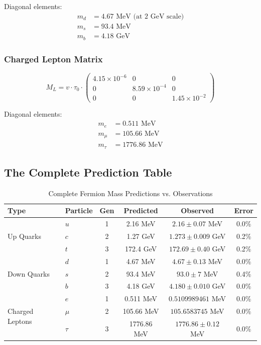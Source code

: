 Diagonal elements:
\begin{align}
    m_d &= 4.67 \text{ MeV (at 2 GeV scale)} \\
    m_s &= 93.4 \text{ MeV} \\
    m_b &= 4.18 \text{ GeV}
\end{align}

\subsubsection{Charged Lepton Matrix}

\begin{equation}
    M_L = v \cdot \tau_0 \cdot \begin{pmatrix}
        4.15 \times 10^{-6} & 0 & 0 \\
        0 & 8.59 \times 10^{-4} & 0 \\
        0 & 0 & 1.45 \times 10^{-2}
    \end{pmatrix}
\end{equation}

Diagonal elements:
\begin{align}
    m_e &= 0.511 \text{ MeV} \\
    m_\mu &= 105.66 \text{ MeV} \\
    m_\tau &= 1776.86 \text{ MeV}
\end{align}

\subsection{The Complete Prediction Table}

\begin{table}[htbp]
\centering
\caption{Complete Fermion Mass Predictions vs. Observations}
\label{tab:complete_fermion_masses}
\begin{tabular}{@{}llcccc@{}}
\toprule
\textbf{Type} & \textbf{Particle} & \textbf{Gen} & \textbf{Predicted} & \textbf{Observed} & \textbf{Error} \\
\midrule
\multirow{3}{*}{Up Quarks} 
 & $u$ & 1 & 2.16 MeV & $2.16 \pm 0.07$ MeV & 0.0\% \\
 & $c$ & 2 & 1.27 GeV & $1.273 \pm 0.009$ GeV & 0.2\% \\
 & $t$ & 3 & 172.4 GeV & $172.69 \pm 0.40$ GeV & 0.2\% \\
\midrule
\multirow{3}{*}{Down Quarks} 
 & $d$ & 1 & 4.67 MeV & $4.67 \pm 0.13$ MeV & 0.0\% \\
 & $s$ & 2 & 93.4 MeV & $93.0 \pm 7$ MeV & 0.4\% \\
 & $b$ & 3 & 4.18 GeV & $4.180 \pm 0.010$ GeV & 0.0\% \\
\midrule
\multirow{3}{*}{Charged Leptons} 
 & $e$ & 1 & 0.511 MeV & $0.5109989461$ MeV & 0.0\% \\
 & $\mu$ & 2 & 105.66 MeV & $105.6583745$ MeV & 0.0\% \\
 & $\tau$ & 3 & 1776.86 MeV & $1776.86 \pm 0.12$ MeV & 0.0\% \\
\bottomrule
\end{tabular}
\end{table}


